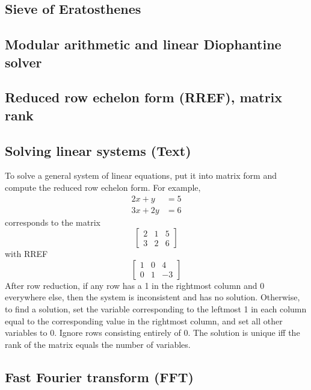 \documentclass[9pt]{extarticle}
\begin{document}
\begin{multicols*}{3}
\pagebreak

\subsection{Sieve of Eratosthenes} %


\subsection{Modular arithmetic and linear Diophantine solver} %


\subsection{Reduced row echelon form (RREF), matrix rank} %


\subsection{Solving linear systems (Text)} %
To solve a general system of linear equations, put it into matrix form and
compute the reduced row echelon form. For example,
\begin{align*}2x + y &= 5 \\ 3x + 2y &= 6\end{align*}
corresponds to the matrix
\[ \left[ \begin{array}{cc|c} 2 & 1 & 5 \\ 3 & 2 & 6 \end{array} \right] \]
with RREF
\[ \left[ \begin{array}{cc|c} 1 & 0 & 4 \\ 0 & 1 & -3 \end{array} \right] \]
After row reduction, if any row has a 1 in the rightmost column and 0
everywhere else, then the system is inconsistent and has no solution.
Otherwise, to find a solution, set the variable corresponding to the leftmost 1
in each column equal to the corresponding value in the rightmost column, and
set all other variables to 0. Ignore rows consisting entirely of 0. The
solution is unique iff the rank of the matrix equals the number of variables.

\subsection{Fast Fourier transform (FFT)} %



\end{multicols*}
\end{document}

